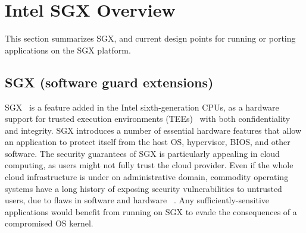 
\section{Intel SGX Overview}
\label{sec:sgx:overview}

This section summarizes SGX,
and current design points for running or porting applications on the SGX platform.


\subsection{SGX (software guard extensions)}
\label{sec:sgx:background:sgx}


SGX~\cite{intelsgx} is a feature added in the Intel sixth-generation CPUs,
as a hardware support for trusted execution environments (TEEs)~\cite{santos09tccp,lie2003implementing,trustzone,amd-sme}
with both confidentiality and integrity.
SGX introduces a number of essential hardware features that allow an application
to protect itself from the host OS, hypervisor, BIOS, and other software.
The security guarantees of SGX is particularly appealing in cloud computing, as users 
might not fully trust the cloud provider.
Even if the whole cloud infrastructure
is under on administrative domain,
commodity operating systems have a long history of exposing security vulnerabilities
to untrusted users, due to 
flaws in software and hardware
~\cite{arbaugh00vulnerability,dirtycow,xu15ccs,liu15llc-attack,kim14rowhammer}.
Any sufficiently-sensitive applications
would benefit from running on SGX to evade the consequences of a compromised OS kernel.


